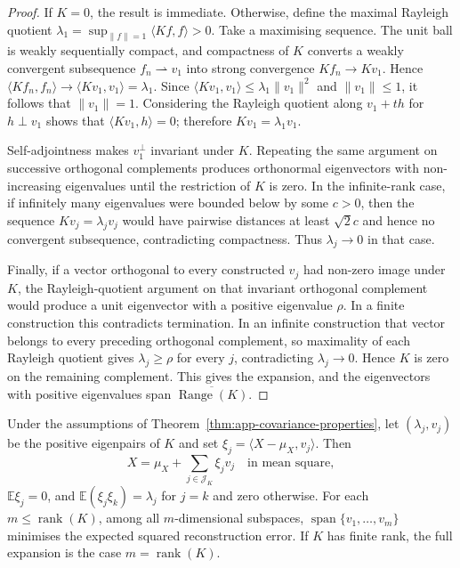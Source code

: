 \begin{proof}
If $K=0$, the result is immediate.  Otherwise, define the maximal Rayleigh
quotient
$\lambda_1=\sup_{\|f\|=1}\langle Kf,f\rangle>0$.  Take a maximising
sequence.  The unit ball is weakly sequentially compact, and compactness of
$K$ converts a weakly convergent subsequence $f_n\rightharpoonup v_1$ into
strong convergence $Kf_n\to Kv_1$.  Hence
$\langle Kf_n,f_n\rangle\to\langle Kv_1,v_1\rangle=\lambda_1$.  Since
$\langle Kv_1,v_1\rangle\leq\lambda_1\|v_1\|^2$ and $\|v_1\|\leq1$, it
follows that $\|v_1\|=1$.  Considering the Rayleigh quotient along
$v_1+th$ for $h\perp v_1$ shows that $\langle Kv_1,h\rangle=0$; therefore
$Kv_1=\lambda_1v_1$.

Self-adjointness makes $v_1^\perp$ invariant under $K$.  Repeating the same
argument on successive orthogonal complements produces orthonormal
eigenvectors with non-increasing eigenvalues until the restriction of $K$
is zero.  In the infinite-rank case, if infinitely many eigenvalues were
bounded below by some $c>0$, then the sequence
$Kv_j=\lambda_jv_j$ would have pairwise distances at least $\sqrt{2}c$ and
hence no convergent subsequence, contradicting compactness.  Thus
$\lambda_j\to0$ in that case.

Finally, if a vector orthogonal to every constructed $v_j$ had non-zero
image under $K$, the Rayleigh-quotient argument on that invariant orthogonal
complement would produce a unit eigenvector with a positive eigenvalue
$\rho$.  In a finite construction this contradicts termination.  In an
infinite construction that vector belongs to every preceding orthogonal
complement, so maximality of each Rayleigh quotient gives
$\lambda_j\geq\rho$ for every $j$, contradicting $\lambda_j\to0$.
Hence $K$ is zero on the remaining complement.  This gives the expansion, and the eigenvectors
with positive eigenvalues span $\overline{\operatorname{Range}(K)}$.
\end{proof}

\begin{proposition}
\label{prop:app-karhunen-loeve}
Under the assumptions of Theorem~\ref{thm:app-covariance-properties}, let
$(\lambda_j,v_j)$ be the positive eigenpairs of $K$ and set
$\xi_j=\langle X-\mu_X,v_j\rangle$.  Then
\[
 X=\mu_X+\sum_{j\in\mathcal J_K}\xi_jv_j
 \quad\text{in mean square},
\]
$\mathbb E\xi_j=0$, and
$\mathbb E(\xi_j\xi_k)=\lambda_j$ for $j=k$ and zero otherwise.  For
each $m\leq\operatorname{rank}(K)$, among all $m$-dimensional subspaces,
$\operatorname{span}\{v_1,\ldots,v_m\}$ minimises the expected squared
reconstruction error.  If $K$ has finite rank, the full expansion is the
case $m=\operatorname{rank}(K)$.
\end{proposition}

